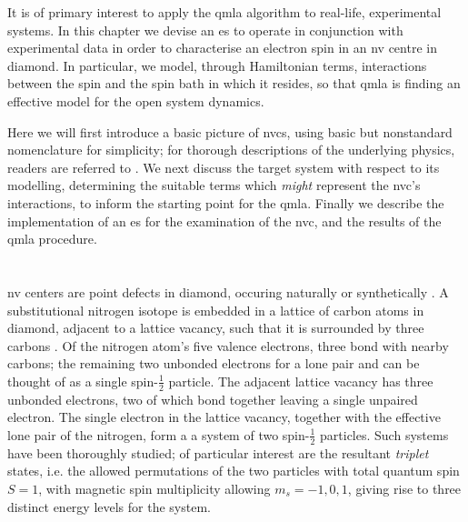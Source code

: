 It is of primary interest to apply the \gls{qmla} algorithm to real-life, experimental systems. 
In this chapter we devise an \gls{es} to operate in conjunction with experimental data 
    in order to characterise an electron spin in an \gls{nv} centre in diamond.
In particular, we model, through Hamiltonian terms, interactions between the spin and 
    the spin bath in which it resides,
    so that \gls{qmla} is finding an effective model for the open system dynamics.
\par

Here we will first introduce a basic picture of \glspl{nvc}, 
    using basic but nonstandard nomenclature for simplicity;
    for thorough descriptions of the underlying physics, readers are referred to \cite{doherty2013nitrogen}.
We next discuss the target system with respect to its modelling, 
    determining the suitable terms which \emph{might} represent the \gls{nvc}'s interactions, 
    to inform the starting point for the \gls{qmla}.
Finally we describe the implementation of an \gls{es} for the examination of the \gls{nvc},
    and the results of the \gls{qmla} procedure. 

\section{}
\label{sec:nv_centres}

\gls{nv} centers are point defects in diamond, 
    occuring naturally \cite{davies1976optical} or synthetically \cite{meijer2005generation, edmonds2012production}.
A substitutional \gls{nitrogen} isotope is embedded in a lattice of carbon atoms in diamond, 
    adjacent to a lattice vacancy, 
    such that it is surrounded by three \glspl{carbon} \cite{lenef1996electronic}. 
Of the \gls{nitrogen} atom's five valence electrons, three bond with nearby \glspl{carbon};
    the remaining two unbonded electrons for a lone pair and can be thought of as a single spin-$\frac{1}{2}$ particle. 
The adjacent lattice vacancy has three unbonded electrons, 
    two of which bond together leaving a single unpaired electron.
The single electron in the lattice vacancy, together with the effective lone pair of the \gls{nitrogen}, 
    form a a system of two spin-$\frac{1}{2}$ particles.
Such systems have been thoroughly studied; 
    of particular interest are the resultant \emph{triplet} states, 
    i.e. the allowed permutations of the two particles with total quantum spin $S=1$, 
    with magnetic spin multiplicity allowing $m_s = {-1, 0, 1}$, 
    giving rise to three distinct energy levels for the system. 
\par 


